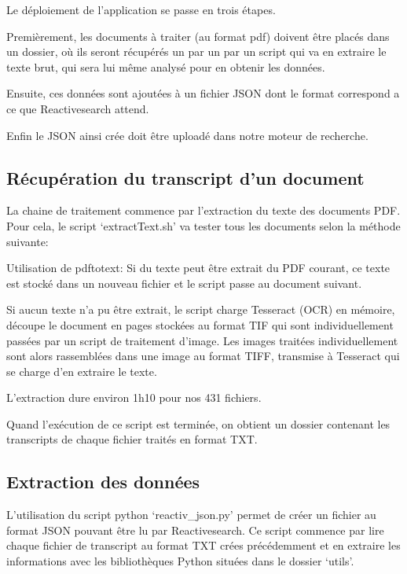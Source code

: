

Le déploiement de l'application se passe en trois étapes.

Premièrement, les documents à traiter (au format pdf) doivent être placés dans un dossier, où ils seront récupérés un par un par un script qui va en extraire le texte brut, qui sera lui même analysé pour en obtenir les données.

Ensuite, ces données sont ajoutées à un fichier JSON dont le format correspond a ce que Reactivesearch attend.

Enfin le JSON ainsi crée doit être uploadé dans notre moteur de recherche.

\subsection{Récupération du transcript d'un document}
La chaine de traitement commence par l'extraction du texte des documents PDF.
Pour cela, le script `extractText.sh' va tester tous les documents selon la méthode suivante:

Utilisation de pdftotext: Si du texte peut être extrait du PDF courant, ce texte est stocké dans un nouveau fichier et le script passe au document suivant.

Si aucun texte n'a pu être extrait, le script charge Tesseract (\gls{OCR}) en mémoire, découpe le document en pages stockées au format TIF qui sont individuellement passées par un script de traitement d'image.
Les images traitées individuellement sont alors rassemblées dans une image au format TIFF, transmise à Tesseract qui se charge d'en extraire le texte.

L'extraction dure environ 1h10 pour nos 431 fichiers.

Quand l'exécution de ce script est terminée, on obtient un dossier contenant les transcripts de chaque fichier traités en format TXT\@.

\subsection{Extraction des données}
L'utilisation du script python `reactiv\_json.py' permet de créer un fichier au format JSON pouvant être lu par Reactivesearch.
Ce script commence par lire chaque fichier de transcript au format TXT crées précédemment et en extraire les informations avec les bibliothèques Python situées dans le dossier `utils'.

